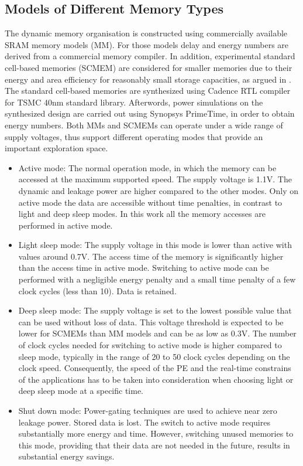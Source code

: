 \subsection{Models of Different Memory Types}
The dynamic memory organisation is constructed using commercially available SRAM memory models (MM).
For those models delay and energy numbers are derived from a commercial memory compiler.
In addition, experimental standard cell-based memories (SCMEM) \cite{Mei11}  are  considered for smaller memories due to their energy and area efficiency for reasonably small storage capacities, as argued in \cite{Mei10}. 
The standard cell-based memories are synthesized using Cadence RTL compiler for TSMC 40nm standard library. 
Afterwords, power simulations on the synthesized design are carried out using Synopsys PrimeTime, in order to obtain energy numbers.
Both MMs and SCMEMs can operate under a wide range of supply voltages, thus support different operating modes that provide an important exploration space.
\begin{itemize}
\item Active mode: The normal operation mode, in which the memory can be accessed at the maximum supported speed. The supply voltage is 1.1V. 
The dynamic and leakage power are higher compared to the other modes.
Only on active mode the data are accessible without time penalties, in contrast to light and deep sleep modes.
In this work all the memory accesses are performed in active mode. 
\item Light sleep mode: The supply voltage in this mode is lower than active with values around 0.7V. 
The access time of the memory is significantly higher than the access time in active mode. 
Switching to active mode can be performed with a negligible energy penalty and a small time penalty of a few clock cycles (less than 10). 
Data is retained.  
\item Deep sleep mode: The supply voltage is set to the lowest possible value that can be used without loss of data. 
This voltage threshold is expected to be lower for SCMEMs than MM models and can be as low as 0.3V. 
The number of clock cycles needed for switching to active mode is higher compared to sleep mode, typically in the range of 20 to 50 clock cycles depending on the clock speed. 
Consequently, the speed of the PE and the real-time constrains of the applications has to be taken into consideration when choosing light or deep sleep mode at a specific time.  
\item Shut down mode: Power-gating techniques are used to achieve near zero leakage power. 
Stored data is lost. 
The switch to active mode requires substantially more energy and time. 
However, switching unused memories to this mode, providing that their data are not needed in the future, results in substantial energy savings.
\end{itemize}  

